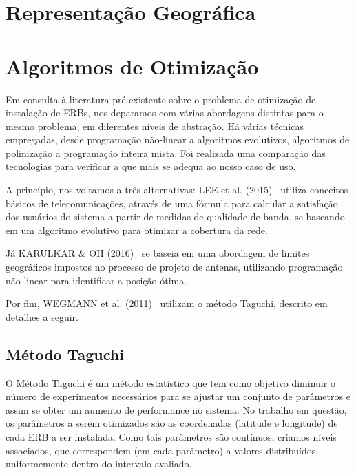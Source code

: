 \documentclass[]{politex}
\begin{document}
\section{Representação Geográfica}


\section{Algoritmos de Otimização}

Em consulta à literatura pré-existente sobre o problema de otimização de
instalação de ERBs, nos deparamos com várias abordagens distintas para o mesmo
problema, em diferentes níveis de abstração. Há várias técnicas empregadas,
desde programação não-linear a algoritmos evolutivos, algoritmos de polinização
a programação inteira mista. Foi realizada uma comparação das tecnologias para
verificar a que mais se adequa ao nosso caso de uso.

A princípio, nos voltamos a três alternativas: LEE et al. (2015)~
\cite{evolutivo} utiliza conceitos básicos de telecomunicações, através de uma
fórmula para calcular a satisfação dos usuários do sistema a partir de medidas
de qualidade de banda, se baseando em um algoritmo evolutivo para otimizar
a cobertura da rede.

Já KARULKAR \& OH (2016)~\cite{nao-linear} se baseia em uma abordagem de limites
geográficos impostos no processo de projeto de antenas, utilizando programação
não-linear para identificar a posição ótima.

Por fim, WEGMANN et al. (2011)~\cite{taguchi} utilizam o método Taguchi,
descrito em detalhes a seguir.

\subsection{Método Taguchi}

O Método Taguchi é um método estatístico que tem como objetivo diminuir o número
de experimentos necessários para se ajustar um conjunto de parâmetros e assim
se obter um aumento de performance no sistema. No trabalho em questão, os
parâmetros a serem otimizados são as coordenadas (latitude e longitude) de cada
ERB a ser instalada. Como tais parâmetros são contínuos, criamos níveis
associados, que correspondem (em cada parâmetro) a valores distribuídos
uniformemente dentro do intervalo avaliado.
\end{document}
